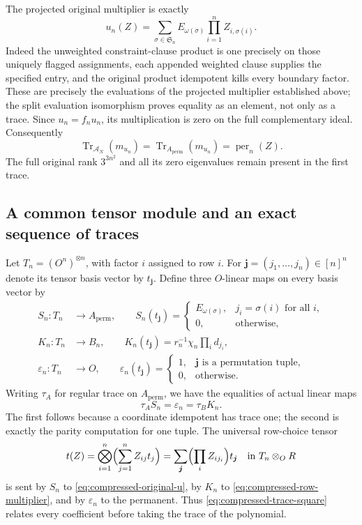 The projected original multiplier is exactly
\begin{equation}\label{eq:compressed-original-u}
 u_n(Z)=\sum_{\sigma\in\mathfrak S_n}
           E_{\omega(\sigma)}\prod_{i=1}^n Z_{i,\sigma(i)}.
\end{equation}
Indeed the unweighted constraint-clause product is one precisely on those uniquely
flagged assignments, each appended weighted clause supplies the
specified entry, and the original product idempotent kills every
boundary factor. These are precisely the evaluations of the
projected multiplier established above; the split evaluation
isomorphism proves equality as an element, not only as a trace.
Since $u_n=f_nu_n$, its multiplication is zero on the full
complementary ideal. Consequently
\[
 \operatorname{Tr}_{\mathcal A_N}(m_{u_n})
 =\operatorname{Tr}_{A_{\mathrm{perm}}}(m_{u_n})
 =\operatorname{per}_n(Z).
\]
The full original rank $3^{3n^2}$ and all its zero eigenvalues
remain present in the first trace.

\subsection{A common tensor module and an exact sequence of traces}

Let $T_n=(O^n)^{\otimes n}$, with factor $i$ assigned to row $i$.
For $\boldsymbol j=(j_1,\ldots,j_n)\in[n]^n$ denote its tensor
basis vector by $t_{\boldsymbol j}$. Define three $O$-linear maps
on every basis vector by
\[
 \begin{split}
 S_n:T_n&\longrightarrow A_{\mathrm{perm}},\qquad
 S_n(t_{\boldsymbol j})=
 \begin{cases}E_{\omega(\sigma)},&j_i=\sigma(i)\text{ for all }i,\\
 0,&\text{otherwise},\end{cases}\\
 K_n:T_n&\longrightarrow B_n,\qquad
 K_n(t_{\boldsymbol j})=r_n^{-1}\chi_n\prod_i d_{j_i},\\
 \varepsilon_n:T_n&\longrightarrow O,\qquad
 \varepsilon_n(t_{\boldsymbol j})=
 \begin{cases}1,&\boldsymbol j\text{ is a permutation tuple},\\
 0,&\text{otherwise}.\end{cases}
 \end{split}
\]
Writing $\tau_A$ for regular trace on $A_{\mathrm{perm}}$, we have
the equalities of actual linear maps
\begin{equation}\label{eq:compressed-trace-square}
 \tau_AS_n=\varepsilon_n=\tau_BK_n.
\end{equation}
The first follows because a coordinate idempotent has trace one;
the second is exactly the parity computation for one tuple.
The universal row-choice tensor
\[
 t(Z)=\bigotimes_{i=1}^n\Bigl(\sum_{j=1}^n Z_{ij}t_j\Bigr)
     =\sum_{\boldsymbol j}\Bigl(\prod_i Z_{ij_i}\Bigr)t_{\boldsymbol j}
 \quad\text{in }T_n\otimes_O R
\]
is sent by $S_n$ to \eqref{eq:compressed-original-u}, by $K_n$
to \eqref{eq:compressed-row-multiplier}, and by $\varepsilon_n$
to the permanent. Thus \eqref{eq:compressed-trace-square} relates
every coefficient before taking the trace of the polynomial.

